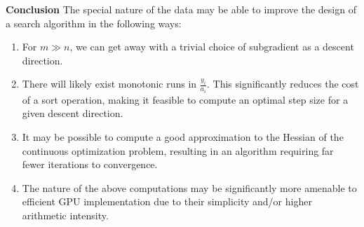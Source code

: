 \documentclass[12pt,journal,draftcls,letterpaper,onecolumn]{IEEEtran}
\begin{document}
{\bf Conclusion } The special nature of the data may be able to improve the design of a search algorithm in the following ways:
\begin{enumerate}
\item For $m \gg n$, we can get away with a trivial choice of subgradient as a descent direction.
\item There will likely exist monotonic runs in $\frac{y_i}{a_i}$.  This significantly reduces the cost of a sort operation, making it feasible to compute an optimal step size for a given descent direction.  
\item It may be possible to compute a good approximation to the Hessian of the continuous optimization problem, resulting in an algorithm requiring far fewer iterations to convergence.  
\item The nature of the above computations may be significantly more amenable to efficient GPU implementation due to their simplicity and/or higher arithmetic intensity.
\end{enumerate}
\end{document}

